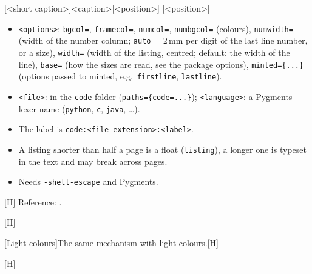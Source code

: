\documentclass[sectioning=nobreak, paths={code=code/}]{myreport}
\begin{document}

\begin{demosyntax}
[<short caption>]{<caption>}[<position>]
[<position>]
\end{demosyntax}
\begin{itemize}
  \item \texttt{<options>}: \texttt{bgcol=}, \texttt{framecol=},
    \texttt{numcol=}, \texttt{numbgcol=} (colours), \texttt{numwidth=}
    (width of the number column; \texttt{auto} = 2\,mm per digit of the
    last line number, or a size), \texttt{width=} (width of the listing,
    centred; default: the width of the line), \texttt{base=} (how the
    sizes are read, see the package options), \texttt{minted=\{...\}}
    (options passed to minted, e.g.\ \texttt{firstline},
    \texttt{lastline}).
  \item \texttt{<file>}: in the \texttt{code} folder
    (\texttt{paths=\{code=...\}}); \texttt{<language>}: a Pygments lexer
    name (\texttt{python}, \texttt{c}, \texttt{java}, \dots).
  \item The label is \texttt{code:<file extension>:<label>}.
  \item A listing shorter than half a page is a float (\texttt{listing}),
    a longer one is typeset in the text and may break across pages.
  \item Needs \texttt{-shell-escape} and Pygments.
\end{itemize}

\begin{demo}
[H]
Reference: .
\end{demo}
\begin{demo}
[H]
\end{demo}
\begin{demo}
[Light colours]{The same mechanism
with light colours.}[H]
\end{demo}
\begin{demo}
[H]
\end{demo}
\begin{demo}
\end{demo}
\begin{demo}
\end{demo}

\mylistofprograms*
\end{document}
